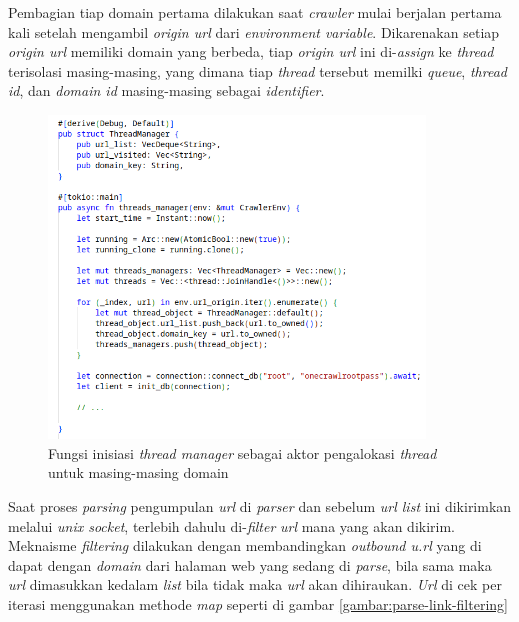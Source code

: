 Pembagian tiap domain pertama dilakukan saat \emph{crawler} mulai berjalan pertama kali setelah mengambil \emph{origin url} dari \emph{environment variable}. Dikarenakan setiap \emph{origin url} memiliki domain yang berbeda, tiap \emph{origin url} ini di-\emph{assign} ke \emph{thread} terisolasi masing-masing, yang dimana tiap \emph{thread} tersebut memilki \emph{queue}, \emph{thread id}, dan \emph{domain id} masing-masing sebagai \emph{identifier}.

\begin{figure}[H]
  \centering
  \includegraphics[keepaspectratio, width=10cm]{gambar/code-thread-manager-init.png}
  \caption{Fungsi inisiasi \emph{thread manager} sebagai aktor pengalokasi \emph{thread} untuk masing-masing domain}
  \label{gambar:thread-manager-start-bfs}
\end{figure}

Saat proses \emph{parsing} pengumpulan \emph{url} di \emph{parser} dan sebelum \emph{url list} ini dikirimkan melalui \emph{unix socket}, terlebih dahulu di-\emph{filter} \emph{url} mana yang akan dikirim. Meknaisme \emph{filtering} dilakukan dengan membandingkan \emph{outbound u.rl} yang di dapat dengan \emph{domain} dari halaman web yang sedang di \emph{parse}, bila sama maka \emph{url} dimasukkan kedalam \emph{list} bila tidak maka \emph{url} akan dihiraukan. \emph{Url} di cek per iterasi menggunakan methode \emph{map} seperti di gambar \ref{gambar:parse-link-filtering}

